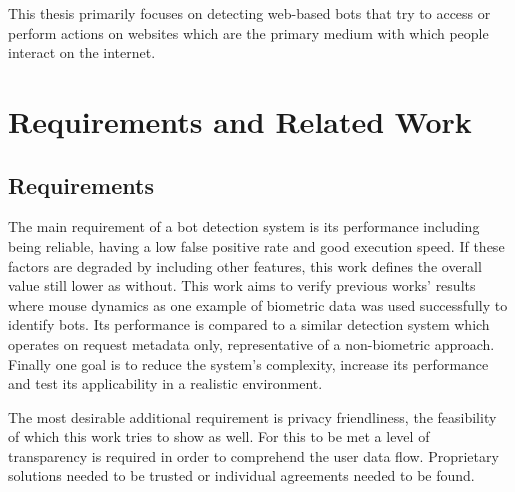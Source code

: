 \documentclass[
    fontsize=12pt,
    headings=small,
    parskip=half,           %
    bibliography=totoc,
    numbers=noenddot,       %
    open=any,               %
    final                   %
]{scrreprt}
\begin{document}
This thesis primarily focuses on detecting web-based bots that try to access or perform actions on websites which are the primary medium with which people interact on the internet.


\chapter{Requirements and Related Work}


\section{Requirements}

The main requirement of a bot detection system is its performance including being reliable, having a low false positive rate and good execution speed. If these factors are degraded by including other features, this work defines the overall value still lower as without. This work aims to verify previous works' results where mouse dynamics as one example of biometric data was used successfully to identify bots. Its performance is compared to a similar detection system which operates on request metadata only, representative of a non-biometric approach. Finally one goal is to reduce the system's complexity, increase its performance and test its applicability in a realistic environment.

The most desirable additional requirement is privacy friendliness, the feasibility of which this work tries to show as well. For this to be met a level of transparency is required in order to comprehend the user data flow. Proprietary solutions needed to be trusted or individual agreements needed to be found.
\end{document}
